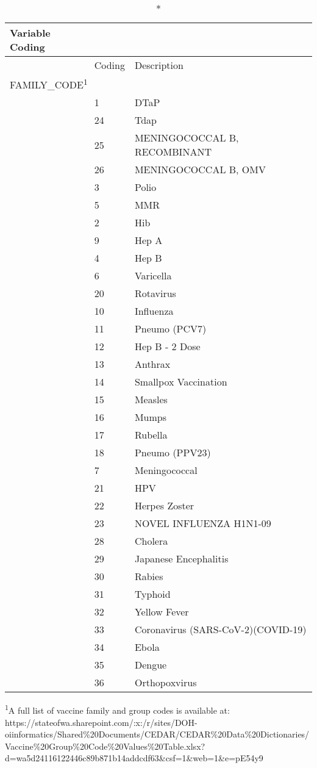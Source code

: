 \documentclass[
  letterpaper,
  DIV=11,
  numbers=noendperiod]{scrreprt}
\begin{document}
\setlength{\LTpost}{0mm}
\begin{longtable}{l|ll}
\caption*{
{\large Variable Coding}
} \\ 
\toprule
\multicolumn{1}{l}{} & Coding & Description \\ 
\midrule
\multicolumn{3}{l}{FAMILY\_CODE\textsuperscript{1}} \\ 
\midrule
  & 1 & DTaP \\ 
  & 24 & Tdap \\ 
  & 25 & MENINGOCOCCAL B, RECOMBINANT \\ 
  & 26 & MENINGOCOCCAL B, OMV \\ 
  & 3 & Polio \\ 
  & 5 & MMR \\ 
  & 2 & Hib \\ 
  & 9 & Hep A \\ 
  & 4 & Hep B \\ 
  & 6 & Varicella \\ 
  & 20 & Rotavirus \\ 
  & 10 & Influenza \\ 
  & 11 & Pneumo (PCV7) \\ 
  & 12 & Hep B - 2 Dose \\ 
  & 13 & Anthrax \\ 
  & 14 & Smallpox Vaccination \\ 
  & 15 & Measles \\ 
  & 16 & Mumps \\ 
  & 17 & Rubella \\ 
  & 18 & Pneumo (PPV23) \\ 
  & 7 & Meningococcal \\ 
  & 21 & HPV \\ 
  & 22 & Herpes Zoster \\ 
  & 23 & NOVEL INFLUENZA H1N1-09 \\ 
  & 28 & Cholera \\ 
  & 29 & Japanese Encephalitis \\ 
  & 30 & Rabies \\ 
  & 31 & Typhoid \\ 
  & 32 & Yellow Fever \\ 
  & 33 & Coronavirus (SARS-CoV-2)(COVID-19) \\ 
  & 34 & Ebola \\ 
  & 35 & Dengue \\ 
  & 36 & Orthopoxvirus \\ 
\bottomrule
\end{longtable}
\begin{minipage}{\linewidth}
\textsuperscript{1}A full list of vaccine family and group codes is available at: https://stateofwa.sharepoint.com/:x:/r/sites/DOH-oiinformatics/Shared\%20Documents/CEDAR/CEDAR\%20Data\%20Dictionaries/Vaccine\%20Group\%20Code\%20Values\%20Table.xlsx?d=wa5d24116122446c89b871b14addcdf63\&csf=1\&web=1\&e=pE54y9\\
\end{minipage}
\end{document}
